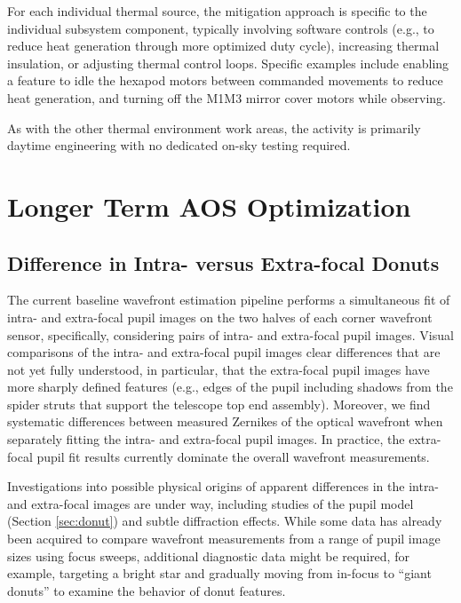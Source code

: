\documentclass[SO,lsst,authoryear,toc]{lsstdoc}
\begin{document}
For each individual thermal source, the mitigation approach is specific to the individual subsystem component, typically involving software controls (e.g., to reduce heat generation through more optimized duty cycle), increasing thermal insulation, or adjusting thermal control loops.
Specific examples include enabling a feature to idle the hexapod motors between commanded movements to reduce heat generation, and turning off the M1M3 mirror cover motors while observing.

As with the other thermal environment work areas, the activity is primarily daytime engineering with no dedicated on-sky testing required.

\section{Longer Term AOS Optimization}
\label{sec:aos_optimization}

\subsection{Difference in Intra- versus Extra-focal Donuts}
\label{sec:intra-extra}

The current baseline wavefront estimation pipeline performs a simultaneous fit of intra- and extra-focal pupil images on the two halves of each corner wavefront sensor, specifically, considering pairs of intra- and extra-focal pupil images.
Visual comparisons of the intra- and extra-focal pupil images clear differences that are not yet fully understood, in particular, that the extra-focal pupil images have more sharply defined features (e.g., edges of the pupil including shadows from the spider struts that support the telescope top end assembly).
Moreover, we find systematic differences between measured Zernikes of the optical wavefront when separately fitting the intra- and extra-focal pupil images.
In practice, the extra-focal pupil fit results currently dominate the overall wavefront measurements.

Investigations into possible physical origins of apparent differences in the intra- and extra-focal images are under way, including studies of the pupil model (Section \ref{sec:donut}) and subtle diffraction effects.
While some data has already been acquired to compare wavefront measurements from a range of pupil image sizes using focus sweeps, additional diagnostic data might be required, for example, targeting a bright star and gradually moving from in-focus to ``giant donuts'' to examine the behavior of donut features.
\end{document}
